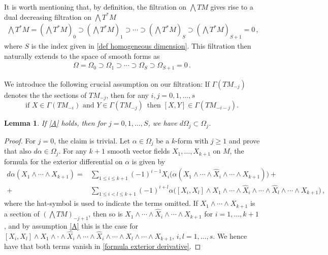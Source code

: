\documentclass[10pt]{amsart}
\newcounter{dummy} \numberwithin{dummy}{section}
\newtheorem{lemma}[dummy]{Lemma}
\theoremstyle{remark}
\numberwithin{equation}{section}
\begin{document}
It is worth mentioning that, by definition, the filtration on $\bigwedge TM$ gives rise to a dual decreasing filtration on $\bigwedge T^*M$
\begin{align*}
    \bigwedge T^*M=(\bigwedge T^*M)_0\supset(\bigwedge T^*M)_1\supset\cdots\supset (\bigwedge T^*M)_S\supset(\bigwedge T^*M)_{S+1}=0\,,
\end{align*}
where $S$ is the index given in \eqref{def homogeneous dimension}. This filtration then naturally extends to the space of smooth forms as
\begin{align*}
\Omega=\Omega_0\supset\Omega_1\supset\cdots\supset\Omega_{S}\supset\Omega_{S+1}=0\,.
\end{align*}
 
We introduce the following crucial assumption on our filtration: If $\Gamma(TM_{-j})$ denotes the the sections of $TM_{-j}$, then for any $i,j=0,1,\dots, s$
\begin{equation}
    \label{A} \tag{A} \text{if } X\in \Gamma(TM_{-i}) \text{ and } Y \in \Gamma(TM_{-j}) \, \text{ then }[X,Y] \in \Gamma(TM_{-i-j}).
\end{equation}
\begin{lemma} \label{lemma:DifferentialIdeal}
If \eqref{A} holds, then for $j =0,1, \dots, S$, we have $d\Omega_j \subset \Omega_j$.
\end{lemma}
\begin{proof}For $j=0$, the claim is trivial. Let $\alpha\in\Omega_j$ be a $k$-form with $j\ge 1$ and prove that also $d\alpha\in\Omega_j$.
For any $k+1$ smooth vector fields $X_1,\ldots,X_{k+1}$ on $M$, the formula for the exterior differential on $\alpha$ is given by
\begin{equation}\label{formula exterior derivative}
\begin{aligned}
    d\alpha (X_1\wedge\cdots\wedge X_{k+1})=&\sum_{1\le i\le k+1}(-1)^{i-1}X_i\big(\alpha(X_1\wedge\cdots\wedge\hat{X}_i\wedge\cdots\wedge X_{k+1})\big)+\\+&\sum_{1\le i<l\le k+1}(-1)^{i+l}\alpha\big([X_i,X_l]\wedge X_1\wedge\cdots\wedge\hat{X}_i\wedge\cdots\wedge\hat{X}_l\wedge\cdots\wedge X_{k+1}\big)\,,
\end{aligned}
\end{equation}
where the hat-symbol is used to indicate the terms omitted. If $X_1 \wedge \cdots \wedge X_{k+1}$ is a section of $(\bigwedge TM)_{-j+1}$, then so is $X_1 \wedge \cdots \wedge \hat X_i \wedge \cdots \wedge X_{k+1}$ for $i=1, \dots, k+1$, and by assumption \eqref{A} this is the case for $[X_i, X_l] \wedge X_1 \wedge \cdot \wedge \hat X_i \wedge \cdots \wedge \hat X_i \wedge \cdots \wedge X_l \wedge \cdots  \wedge X_{k+1}$, $i,l=1, \dots, s$. We hence have that both terms vanish in \eqref{formula exterior derivative}.
\end{proof}
\end{document}
